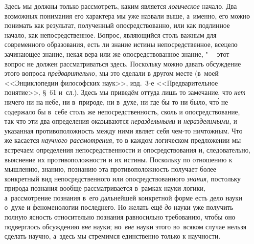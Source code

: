 Здесь мы должны только рассмотреть, каким является {\em логическое} начало. Два
возможных понимания его характера мы уже назвали выше, а~именно, его можно
понимать как результат, полученный опосредствованно, или как подлинное начало,
как непосредственное. Вопрос, являющийся столь важным для современного
образования, есть ли знание истины непосредственное, всецело зачинающее знание,
некая вера или же опосредствованное знание, "--- этот вопрос не должен
рассматриваться здесь. Поскольку можно давать обсуждение этого вопроса
{\em предварительно,} мы это сделали в другом месте (в~моей <<Энциклопедии
философских наук>>, изд.~3-е <<Предварительное понятие>>, \S~61 и~сл.). Здесь
мы приведём оттуда лишь то замечание, что {\em нет} ничего ни на небе, ни
в~природе, ни в~духе, ни где бы то ни было, чт\'{о} не содержало бы в~себе
столь же непосредственность, сколь и опосредствование, так что эти два
определения оказываются {\em нераздельными} и {\em неразделимыми,} и указанная
противоположность между ними являет себя чем-то ничтожным. Что же касается
{\em научного рассмотрения,} то в каждом логическом предложении мы встречаем
определения непосредственности и опосредствования и, следовательно, выяснение
их противоположности и их истины. Поскольку по отношению к мышлению, знанию,
познанию эта противоположность получает более конкретный вид непосредственного
или опосредствованного {\em знания,} постольку природа познания вообще
рассматривается в~рамках науки логики, а~рассмотрение познания в~его дальнейшей
конкретной форме есть дело науки о~духе и феноменологии последнего. Но желать
ещё {\em до} науки уже получить полную ясность относительно познания
равносильно требованию, чтобы оно подверглось обсуждению {\em вне} науки;
но~{\em вне} науки этого во~всяком случае нельзя сделать научно, а~здесь мы
стремимся единственно только к научности.

